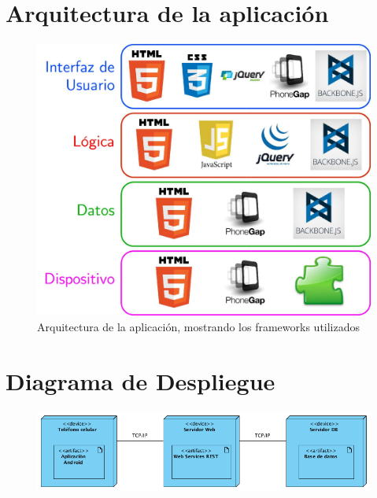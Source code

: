 \section{Arquitectura de la aplicación}

\begin{figure}[H]
  \centering
    \includegraphics[width=1\textwidth]{imagenes/implementacion/arquitectura.jpg}
    
     \caption{Arquitectura de la aplicación, mostrando los frameworks utilizados}
    \label{fig:arquitectura-aplicacion}
\end{figure}

\section{Diagrama de Despliegue}

 \begin{figure}[H]
  \centering
    \includegraphics[width=1\textwidth]{imagenes/implementacion/despliegue.png}
    \label{diagrama-despliegue}
\end{figure}

